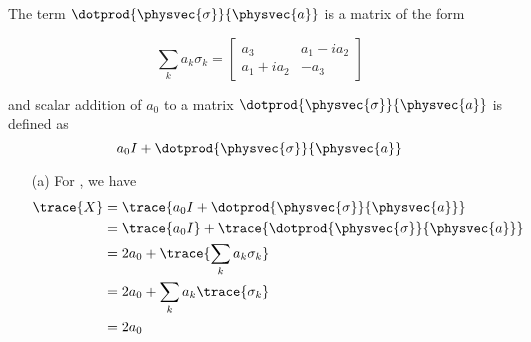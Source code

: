 The term $\dotprod{\physvec{\sigma}}{\physvec{a}}$ is a matrix of the form

\[
\sum_k a_k\sigma_k =
\begin{bmatrix}
  a_3 & a_1 - ia_2 \\
  a_1 + ia_2 & -a_3
\end{bmatrix}
\]

and scalar addition of $a_0$ to a matrix
$\dotprod{\physvec{\sigma}}{\physvec{a}}$ is defined as
\[ a_0I + \dotprod{\physvec{\sigma}}{\physvec{a}} \]

\begin{itemize}
\item[(a)]
  For , we have
  \begin{align*}
    \trace{X} &= \trace{a_0I + \dotprod{\physvec{\sigma}}{\physvec{a}}} \\
    &= \trace{a_0I} + \trace{\dotprod{\physvec{\sigma}}{\physvec{a}}} \\
    &= 2a_0 + \trace{\sum_k a_k\sigma_k} \\
    &= 2a_0 + \sum_k a_k\trace{\sigma_k} \\
    &= 2a_0
  \end{align*}


\end{itemize}
